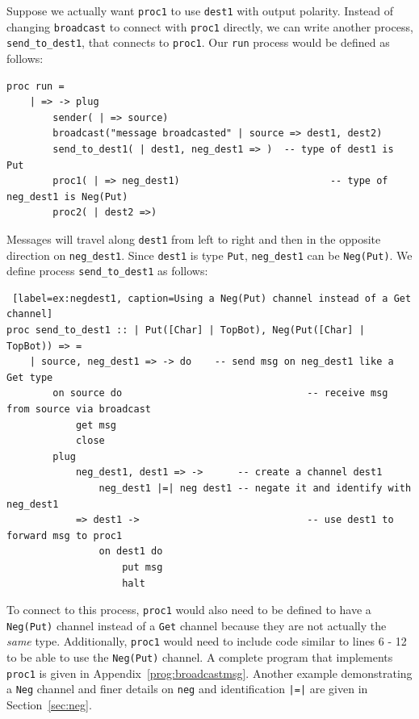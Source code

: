 \documentclass[acmsmall]{acmart}
\begin{document}
Suppose we actually want \lstinline$proc1$ to use \lstinline$dest1$ with output polarity.
Instead of changing \lstinline$broadcast$ to connect with \lstinline$proc1$ directly, we can write another process, \lstinline$send_to_dest1$, that connects to \lstinline$proc1$.
Our \lstinline$run$ process would be defined as follows:
\begin{lstlisting}
proc run =
	| => -> plug
		sender( | => source)
		broadcast("message broadcasted" | source => dest1, dest2)
		send_to_dest1( | dest1, neg_dest1 => )	-- type of dest1 is Put 
		proc1( | => neg_dest1)							-- type of neg_dest1 is Neg(Put)
		proc2( | dest2 =>)
\end{lstlisting}	
Messages will travel along \lstinline$dest1$ from left to right and then in the opposite direction on \lstinline$neg_dest1$.
Since \lstinline$dest1$ is type \lstinline$Put$, \lstinline$neg_dest1$ can be \lstinline$Neg(Put)$. 
We define process \lstinline$send_to_dest1$ as follows:
\begin{lstlisting} [label=ex:negdest1, caption=Using a Neg(Put) channel instead of a Get channel] 
proc send_to_dest1 :: | Put([Char] | TopBot), Neg(Put([Char] | TopBot)) => =
	| source, neg_dest1 => -> do	-- send msg on neg_dest1 like a Get type
		on source do								-- receive msg from source via broadcast
			get msg
			close
		plug
			neg_dest1, dest1 => -> 		-- create a channel dest1
				neg_dest1 |=| neg dest1 -- negate it and identify with neg_dest1
			=> dest1 -> 							-- use dest1 to forward msg to proc1
				on dest1 do	
					put msg
					halt
\end{lstlisting}
To connect to this process, \lstinline$proc1$ would also need to be defined to have a \lstinline$Neg(Put)$ channel instead of a \lstinline$Get$ channel because they are not actually the {\em same} type.
Additionally, \lstinline$proc1$ would need to include code similar to lines 6 - 12 to be able to use the \lstinline$Neg(Put)$ channel.
A complete program that implements \lstinline$proc1$ is given in Appendix~\ref{prog:broadcastmsg}.
Another example demonstrating a \lstinline$Neg$ channel and finer details on \lstinline$neg$ and identification \lstinline$|=|$ are given in Section~\ref{sec:neg}.
\end{document}
